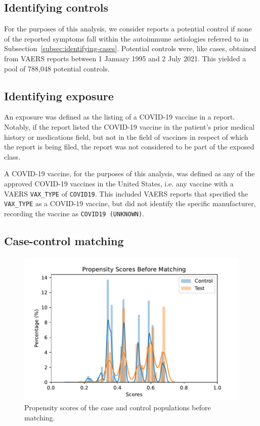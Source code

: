 \documentclass{article}
\begin{document}
\subsection{Identifying controls}

For the purposes of this analysis, we consider reports a potential control if none of the reported symptoms fall within the autoimmune aetiologies referred to in Subsection~\ref{subsec:identifying-cases}.
Potential controls were, like cases, obtained from VAERS reports between 1 January 1995 and 2 July 2021.
This yielded a pool of 788,048 potential controls.

\subsection{Identifying exposure}

An exposure was defined as the listing of a COVID-19 vaccine in a report.
Notably, if the report listed the COVID-19 vaccine in the patient's prior medical history or medications field, but not in the field of vaccines in respect of which the report is being filed, the report was not considered to be part of the exposed class.

A COVID-19 vaccine, for the purposes of this analysis, was defined as any of the approved COVID-19 vaccines in the United States, i.e. any vaccine with a VAERS \texttt{VAX\_TYPE} of \texttt{COVID19}.
This included VAERS reports that specified the \texttt{VAX\_TYPE} as a COVID-19 vaccine, but did not identify the specific manufacturer, recording the vaccine as \texttt{COVID19 (UNKNOWN)}.


\subsection{Case-control matching}

\begin{figure}
    \includegraphics[width=12.5 cm]{propensity_scores}
    \caption{Propensity scores of the case and control populations before matching.}
    \label{fig:propensity_scores}
\end{figure}
\end{document}
